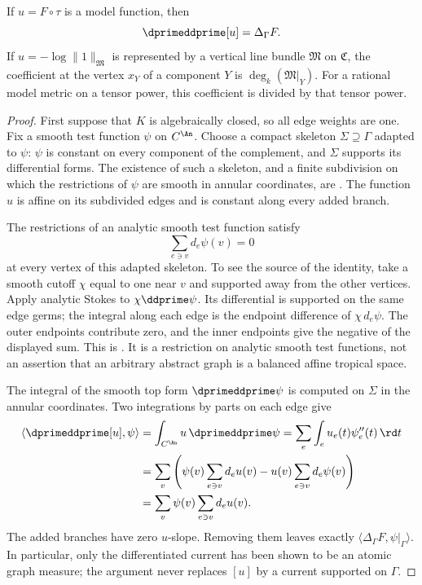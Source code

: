 \begin{proposition}
\label{prop:skeletal-curvature-curve}
If $u=F\circ\tau$ is a model function, then
\[
                           \dprimeddprime[u]=\Delta_\Gamma F .
\]
If $u=-\log\|1\|_{\mathfrak M}$ is represented by a vertical line
bundle $\mathfrak M$ on $\mathfrak C$, the coefficient at the vertex
$x_Y$ of a component $Y$ is $\deg_k(\mathfrak M|_Y)$.
For a rational model metric on a tensor power, this coefficient is
divided by that tensor power.
\end{proposition}

\begin{proof}
First suppose that $K$ is algebraically closed, so all edge weights
are one.  Fix a smooth test function $\psi$ on $C^{\An}$.
Choose a compact skeleton $\Sigma\supseteq\Gamma$ adapted to $\psi$:
$\psi$ is constant on every component of the complement, and
$\Sigma$ supports its differential forms.
The existence of such a skeleton, and a finite subdivision on which
the restrictions of $\psi$ are smooth in annular coordinates, are
\cite[Lemma~18.2.14(a) and the calculation preceding
Lemma~18.2.17]{CLD25}.  The function $u$ is affine on its subdivided
edges and is constant along every added branch.

The restrictions of an analytic smooth test function satisfy
\[
                         \sum_{e\ni v}d_e\psi(v)=0
\]
at every vertex of this adapted skeleton.  To see the source of the
identity, take a smooth cutoff $\chi$ equal to one near $v$ and
supported away from the other vertices.  Apply analytic Stokes to
$\chi\ddprime\psi$.  Its differential is supported on the same
edge germs; the integral along each edge is the endpoint difference
of $\chi\,d_e\psi$.  The outer endpoints contribute zero, and the
inner endpoints give the negative of the displayed sum.
This is \cite[Lemma~18.2.17]{CLD25}.  It is a restriction on
analytic smooth test functions, not an assertion that an arbitrary
abstract graph is a balanced affine tropical space.

The integral of the smooth top form $\dprimeddprime\psi$ is computed
on $\Sigma$ in the annular coordinates.  Two integrations by parts
on each edge give
\[
\begin{aligned}
 \langle\dprimeddprime[u],\psi\rangle
   &=\int_{C^{\An}}u\,\dprimeddprime\psi
     =\sum_e\int_e u_e(t)\psi_e''(t)\,\rd t\\
   &=\sum_v\left(
        \psi(v)\sum_{e\ni v}d_eu(v)
        -u(v)\sum_{e\ni v}d_e\psi(v)\right)\\
   &=\sum_v\psi(v)\sum_{e\ni v}d_eu(v).
\end{aligned}
\]
The added branches have zero $u$-slope.  Removing them leaves
exactly $\langle\Delta_\Gamma F,\psi|_\Gamma\rangle$.
In particular, only the differentiated current has been shown to
be an atomic graph measure; the argument never replaces $[u]$ by a
current supported on $\Gamma$.


\end{proof}
